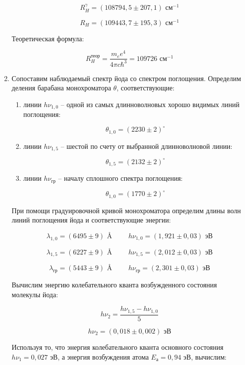 \documentclass[a4paper, 12pt]{article}%
\begin{document}
\begin{enumerate}
\[R_H^{\gamma} = (108794,5 \pm 207,1) \text{ см}^{-1}\]

\[R_H = (109443,7 \pm 195,3) \text{ см}^{-1}\]

Теоретическая формула:

\[R_H^{\text{теор}} = \dfrac{m_e e^4}{4 \pi c \hbar^3} = 109726 \text{ см}^{-1}\]

\item Сопоставим наблюдаемый спектр йода со спектром поглощения.  Определим деления барабана монохроматора $\theta$,  соответствующие:

\begin{enumerate}

	\item линии $h \nu_{1, 0}$ -- одной из самых длинноволновых хорошо видимых линий поглощения:
    
		\[\theta_{1, 0} = (2230 \pm 2)^{\circ}\]
    
	\item линии $h \nu_{1, 5}$ -- шестой по счету от выбранной длинноволновой линии: 
	
		\[\theta_{1, 5} = (2132 \pm 2)^{\circ}\]
    
    \item линии $h \nu_{\text{гр}}$ -- началу сплошного спектра поглощения: 
    
		\[\theta_{1, 0} = (1770 \pm 2)^{\circ}\]
    
\end{enumerate}

	При помощи градуировочной кривой монохроматора определим длины волн линий поглощения йода и соответствующие энергии:
	
\[ \lambda_{1, 0} = (6495 \pm 9) \text{ \AA} \hspace{1cm} h \nu_{1, 0} = (1,921 \pm 0,03) \text{ эВ}\]

\[\lambda_{1, 5} = (6227 \pm 9) \text{ \AA} \hspace{1cm} h \nu_{1, 5} = (2,012 \pm 0,03) \text{ эВ}\]

\[\lambda_{\text{гр}} = (5443 \pm 9) \text{ \AA} \hspace{1cm} h \nu_{\text{гр}} = (2,301 \pm 0,03) \text{ эВ}\]

Вычислим энергию колебательного кванта возбужденного состояния молекулы йода:

\[h \nu_2 = \frac{h \nu_{1, 5} - h \nu_{1, 0}}{5}\]

\[h \nu_2 = (0,018 \pm 0,002) \text{ эВ}\]

Используя то,  что энергия колебательного кванта основного состояния $h \nu_1 = 0,027 \text{ эВ}$,  а энергия возбуждения атома $E_{\text{а}} = 0,94 \text{ эВ}$, вычислим:


\end{enumerate}
\end{document}
